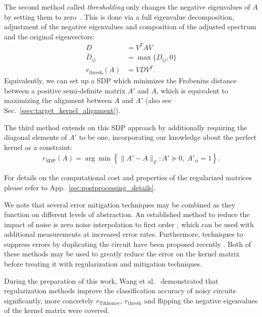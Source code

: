 \documentclass[twocolumn,superscriptaddress,nofootinbib]{revtex4-2}
\begin{document}
The second method called \emph{thresholding} only changes the negative eigenvalues of $A$ by setting them to zero~\cite{graepel1999Classification}.
This is done via a full eigenvalue decomposition, adjustment of the negative eigenvalues and composition of the adjusted spectrum and the original eigenvectors:
\begin{align}\label{eq:thresholding}
    D &= V^T A V\\
    \overline{D}_{ij} &= \max\{D_{ij}, 0\}\\
    r_\mathrm{thresh}(A) &= V \overline{D} V^T.
\end{align}
Equivalently, we can set up a \ac{SDP} which minimizes the Frobenius distance between a positive semi-definite matrix $A'$ and $A$, which is equivalent to maximizing the alignment between $A$ and $A'$ (also see Sec.~\ref{ssec:target_kernel_alignment}).

The third method extends on this \ac{SDP} approach by additionally requiring the diagonal elements of $A'$ to be one, incorporating our knowledge about the perfect kernel as a constraint:
\begin{align}
    r_\mathrm{SDP}(A)=\operatorname{arg}\min \left\{ \lVert A'-A \rVert_F : A'\succcurlyeq 0,\; A'_{ii}=1 \right\}.\nonumber
\end{align}

For details on the computational cost and properties of the regularized matrices please refer to App.~\ref{sec:postprocessing_details}.

We note that several error mitigation techniques may be combined as they function on different levels of abstraction.
An established method to reduce the impact of noise is zero noise interpolation to first order \cite{temme2017error, kandala2018extending, havlicekSupervisedLearningQuantum2019}, which can be used with additional measurements at increased error rates.
Furthermore, techniques to suppress errors by duplicating the circuit have been proposed recently \cite{huggins2020virtual, koczor2020exponential}.
Both of these methods may be used to greatly reduce the error on the kernel matrix before treating it with regularization and mitigation techniques.

During the preparation of this work, Wang et al.~\cite{wang2021UnderstandingQEKPower} demonstrated that regularization methods improve the classification accuracy of noisy circuits significantly, more concretely $r_\mathrm{Tikhonov}$, $r_\mathrm{thresh}$ and flipping the negative eigenvalues of the kernel matrix were covered.
\end{document}

